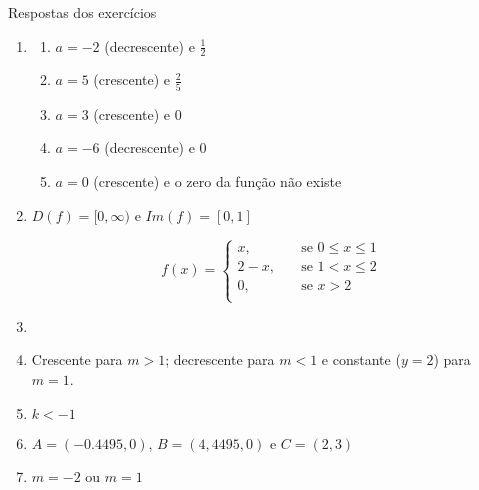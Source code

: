 \begin{frame}[allowframebreaks]{Respostas dos exercícios}
\begin{enumerate}
        \item 
        \begin{multicols}{2}
            \begin{enumerate}[a]
                \item $a = -2$ (decrescente) e $\frac{1}{2}$
                \item $a = 5$ (crescente) e $\frac{2}{5}$
                \item $a = 3$ (crescente) e 0
                \item $a = -6$ (decrescente) e 0
                \item $a = 0$ (crescente) e o zero da função não existe
            \end{enumerate}
        \end{multicols} 

        \item $D(f) = [0, \infty)$ e $Im(f) = [0, 1]$

        \begin{equation*}
            f(x) = \begin{cases}
                        x, &\quad \text{se } 0 \leq x \leq 1 \\
                        2-x, &\quad \text{se } 1 < x \leq 2 \\
                        0, &\quad \text{se } x > 2 \\
                   \end{cases}
        \end{equation*}

        \item 

        \item Crescente para $m > 1$; decrescente para $m < 1$ e constante ($y=2$) para $m=1$.

        \item $k < -1$

        \item $A = (-0.4495,0)$, $B = (4,4495,0)$ e $C = (2,3)$

        \item $m = -2$ ou $m = 1$


\end{enumerate}
\end{frame}
